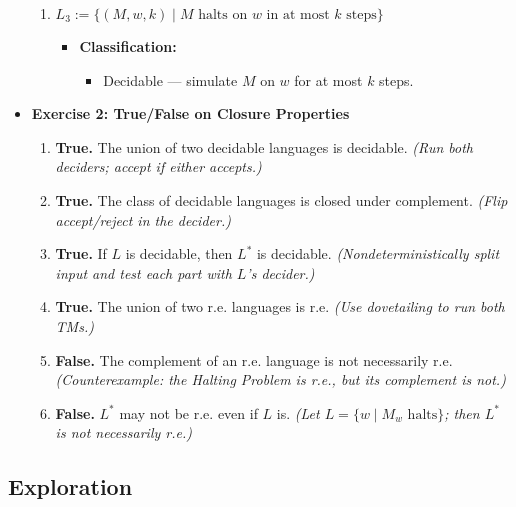 \documentclass[11pt]{article}
\begin{document}
\begin{itemize}[leftmargin=*]
\begin{enumerate}
    \item \( L_3 := \{ (M, w, k) \mid M \text{ halts on } w \text{ in at most } k \text{ steps} \} \)

    \begin{itemize}
        \item \textbf{Classification:}
        \begin{itemize}
            \item Decidable — simulate \( M \) on \( w \) for at most \( k \) steps.
        \end{itemize}
    \end{itemize}
\end{enumerate}

\vspace{1em}

\item \textbf{Exercise 2: True/False on Closure Properties}

\begin{enumerate}
    \item \textbf{True.} The union of two decidable languages is decidable.  
    \textit{(Run both deciders; accept if either accepts.)}

    \item \textbf{True.} The class of decidable languages is closed under complement.  
    \textit{(Flip accept/reject in the decider.)}

    \item \textbf{True.} If \( L \) is decidable, then \( L^* \) is decidable.  
    \textit{(Nondeterministically split input and test each part with \( L \)'s decider.)}

    \item \textbf{True.} The union of two r.e. languages is r.e.  
    \textit{(Use dovetailing to run both TMs.)}

    \item \textbf{False.} The complement of an r.e. language is not necessarily r.e.  
    \textit{(Counterexample: the Halting Problem is r.e., but its complement is not.)}

    \item \textbf{False.} \( L^* \) may not be r.e. even if \( L \) is.  
    \textit{(Let \( L = \{ w \mid M_w \text{ halts} \} \); then \( L^* \) is not necessarily r.e.)}
\end{enumerate}

\end{itemize}

\subsection{Exploration}
\end{document}
